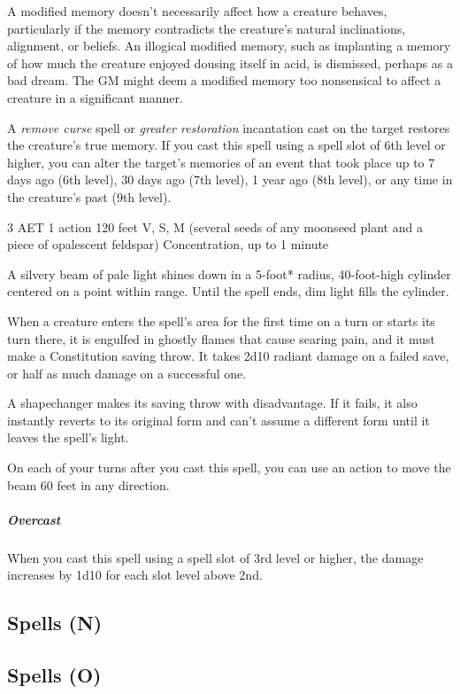 A modified memory doesn't necessarily affect how a creature behaves, particularly if the memory contradicts the creature's natural inclinations, alignment, or beliefs. An illogical modified memory, such as implanting a memory of how much the creature enjoyed dousing itself in acid, is dismissed, perhaps as a bad dream. The GM might deem a modified memory too nonsensical to affect a creature in a significant manner.

A \textit{remove curse} spell or \textit{greater restoration} incantation cast on the target restores the creature's true memory.
{If you cast this spell using a spell slot of 6th level or higher, you can alter the target's memories of an event that took place up to 7 days ago (6th level), 30 days ago (7th level), 1 year ago (8th level), or any time in the creature's past (9th level).}

\label{spell:moonbeam}
{3 AET}
{1 action}
{120 feet}
{V, S, M (several seeds of any moonseed plant and a piece of opalescent feldspar)}
{Concentration, up to 1 minute}

A silvery beam of pale light shines down in a 5-foot* radius, 40-foot-high cylinder centered on a point within range. Until the spell ends, dim light fills the cylinder.

When a creature enters the spell's area for the first time on a turn or starts its turn there, it is engulfed in ghostly flames that cause searing pain, and it must make a Constitution saving throw. It takes 2d10 radiant damage on a failed save, or half as much damage on a successful one.

A shapechanger makes its saving throw with disadvantage. If it fails, it also instantly reverts to its original form and can't assume a different form until it leaves the spell's light.

On each of your turns after you cast this spell, you can use an action to move the beam 60 feet in any direction.
\subparagraph*{Overcast} When you cast this spell using a spell slot of 3rd level or higher, the damage increases by 1d10 for each slot level above 2nd.

\subsection{Spells (N)}

\subsection{Spells (O)}

